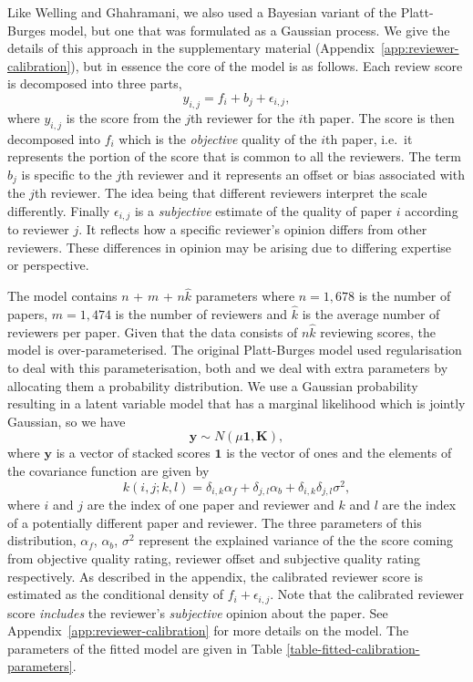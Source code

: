 \documentclass[twoside]{article}
\begin{document}
Like Welling and Ghahramani, we also used a Bayesian variant of the Platt-Burges model, but one that was
formulated as a Gaussian process. We give the details of this approach
in the supplementary material (Appendix~\ref{app:reviewer-calibration}),
but in essence the core of the model is as follows. Each review score
is decomposed into three parts,
$$
y_{i,j} = f_i + b_j + \epsilon_{i, j},
$$
where $y_{i,j}$ is the score from the $j$th reviewer for the $i$th
paper. The score is then decomposed into $f_i$ which is the
\emph{objective} quality of the $i$th paper, i.e.\ it represents the
portion of the score that is common to all the reviewers. The term
$b_j$ is specific to the $j$th reviewer and it represents an offset or
bias associated with the $j$th reviewer. The idea being that different
reviewers interpret the scale differently. Finally $\epsilon_{i,j}$ is
a \emph{subjective} estimate of the quality of paper $i$ according to
reviewer $j$. It reflects how a specific reviewer's opinion differs
from other reviewers. These differences in opinion may be arising due
to differing expertise or perspective.

The model contains $n$ + $m$ + $n\hat{k}$ parameters where $n=1,678$
is the number of papers, $m=1,474$ is the number of reviewers and
$\hat{k}$ is the average number of reviewers per paper. Given that the
data consists of $n\hat{k}$ reviewing scores, the model is
over-parameterised. The original Platt-Burges model used
regularisation to deal with this parameterisation, both
\cite{Ge-bayesian15} and we deal with extra
parameters by allocating them a probability distribution. We use a Gaussian probability resulting in a latent
variable model that has a marginal likelihood which is jointly
Gaussian, so we have
$$
\mathbf{y} \sim N(\mu \mathbf{1}, \mathbf{K}),
$$
where $\mathbf{y}$ is a vector of stacked scores $\mathbf{1}$ is
the vector of ones and the elements of the covariance function are given
by
$$
k(i,j; k,l) = \delta_{i,k} \alpha_f + \delta_{j,l} \alpha_b + \delta_{i, k}\delta_{j,l} \sigma^2,
$$ where $i$ and $j$ are the index of one paper and reviewer and $k$
and $l$ are the index of a potentially different paper and
reviewer. The three parameters of this distribution, $\alpha_f$,
$\alpha_b$, $\sigma^2$ represent the explained variance of the the
score coming from objective quality rating, reviewer offset and
subjective quality rating respectively. As described in the appendix,
the calibrated reviewer score is estimated as the conditional density
of $f_i + \epsilon_{i,j}$. Note that the calibrated reviewer score
\emph{includes} the reviewer's \emph{subjective} opinion about the
paper. See Appendix~\ref{app:reviewer-calibration} for more details
on the model. The parameters of the fitted model are given in
Table \ref{table-fitted-calibration-parameters}.
\end{document}
